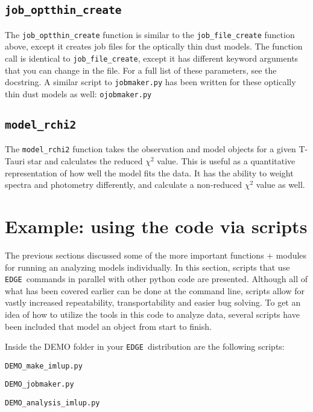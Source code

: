 \documentclass{article}
\newcommand{\edge}{\texttt{EDGE }}
\begin{document}
\subsection{\texttt{job\_optthin\_create}}
The \texttt{job\_optthin\_create} function is similar to the \texttt{job\_file\_create} function above, except it creates job files for the optically thin dust models. The function call is identical to \texttt{job\_file\_create}, except it has different keyword arguments that you can change in the file. For a full list of these parameters, see the docstring. A similar script to \texttt{jobmaker.py} has been written for these optically thin dust models as well: \texttt{ojobmaker.py}


\subsection{\texttt{model\_rchi2}}
 
The \texttt{model\_rchi2} function takes the observation and model objects for a given T-Tauri star and calculates the reduced $\chi^2$ value. This is useful as a quantitative representation of how well the model fits the data. It has the ability to weight spectra and photometry differently, and calculate a non-reduced $\chi^2$ value as well. 

\section{Example: using the code via scripts} \label{scripts}

The previous sections discussed some of the more important functions + modules for running an analyzing models individually. In this section, scripts that use \edge commands in parallel with other python code are presented. Although all of what has been covered earlier can be done at the command line, scripts allow for vastly increased repeatability, transportability and easier bug solving. To get an idea of how to utilize the tools in this code to analyze data, several scripts have been included that model an object from start to finish.

Inside the DEMO folder in your \edge distribution are the following scripts:

\vspace{2mm}
\texttt{DEMO\_make\_imlup.py}

\texttt{DEMO\_jobmaker.py}

\texttt{DEMO\_analysis\_imlup.py}
\vspace{2mm}
\end{document}
